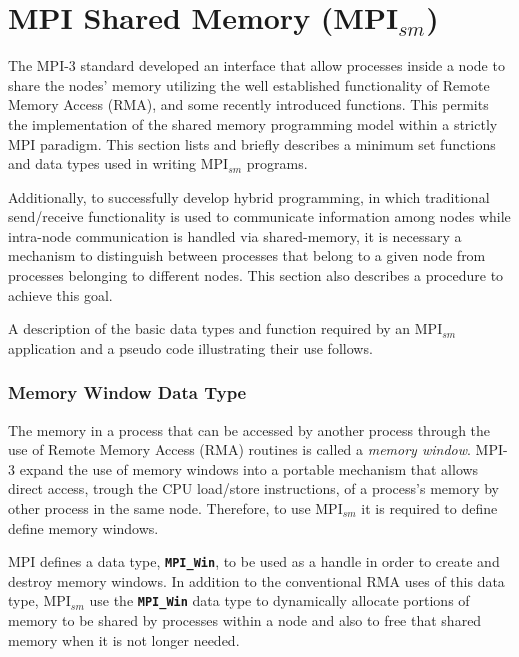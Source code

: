\section{MPI Shared Memory (MPI$_{sm}$)}

The MPI-3 standard developed an interface that allow processes inside a node to share the nodes' memory utilizing the well established functionality of Remote Memory Access (RMA), and some recently introduced functions. This permits the implementation of the shared memory programming model within a strictly MPI paradigm. This section lists and briefly describes a minimum set functions and data types used in writing MPI$_{sm}$ programs. 
\medskip

Additionally, to successfully develop hybrid programming, in which traditional send/receive functionality is used to communicate information among nodes while intra-node communication is handled via shared-memory, it is necessary a mechanism to distinguish between processes that belong to a given node from processes belonging to different nodes. This section also describes a procedure to achieve this goal. 


\medskip

A description of the basic data types and function required by an MPI$_{sm}$ application and a pseudo code illustrating their use follows.


\medskip



\subsubsection*{Memory Window Data Type}

The memory in a process that can be accessed by another process through the use of Remote Memory Access (RMA) routines is called a \emph{memory window}. MPI-3 expand the use of memory windows into a portable mechanism that allows direct access, trough the CPU load/store instructions, of a process's memory by other process in the same node. Therefore, to use MPI$_{sm}$ it is required to define define memory windows.

\medskip

MPI defines a data type, \textbf{\texttt{MPI\_Win}}, to be used as a handle in order to create and destroy memory windows. In addition to the conventional RMA uses of this data type, MPI$_{sm}$ use the \textbf{\texttt{MPI\_Win}} data type to dynamically allocate portions of memory to be shared by processes within a node and also to free that shared memory when it is not longer needed.


